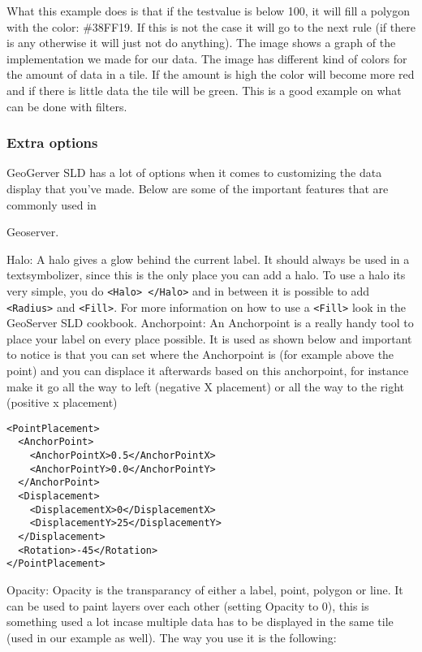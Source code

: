 What this example does is that if the testvalue is below 100, it will fill a polygon with the color: \#38FF19. If this is not the case it will go to the next rule (if there is any otherwise it will just not do anything). The image shows a graph of the implementation we made for our data. The image has different kind of colors for the amount of data in a tile. If the amount is high the color will become more red and if there is little data the tile will be green. This is a good example on what can be done with filters.

\subsubsection{Extra options}

GeoGerver SLD has a lot of options when it comes to customizing the data display that you've made. Below are some of the important features that are commonly used in 

Geoserver.

Halo: A halo gives a glow behind the current label. It should always be used in a textsymbolizer, since this is the only place you can add a halo. To use a halo its very simple, you do \lstinline|<Halo> </Halo>| and in between it is possible to add \lstinline|<Radius>| and \lstinline|<Fill>|. For more information on how to use a \lstinline|<Fill>| look in the GeoServer SLD cookbook.
\newline
Anchorpoint: An Anchorpoint is a really handy tool to place your label on every place possible. It is used as shown below and important to notice is that you can set where the Anchorpoint is (for example above the point) and you can displace it afterwards based on this anchorpoint, for instance make it go all the way to left (negative X placement) or all the way to the right (positive x placement)
\begin{lstlisting}
<PointPlacement>
  <AnchorPoint>
    <AnchorPointX>0.5</AnchorPointX>
    <AnchorPointY>0.0</AnchorPointY>
  </AnchorPoint>
  <Displacement>
    <DisplacementX>0</DisplacementX>
    <DisplacementY>25</DisplacementY>
  </Displacement>
  <Rotation>-45</Rotation>
</PointPlacement>
\end{lstlisting}
Opacity: Opacity is the transparancy of either a label, point, polygon or line. It can be used to paint layers over each other (setting Opacity to 0), this is something used a lot incase multiple data has to be displayed in the same tile (used in our example as well). The way you use it is the following:

